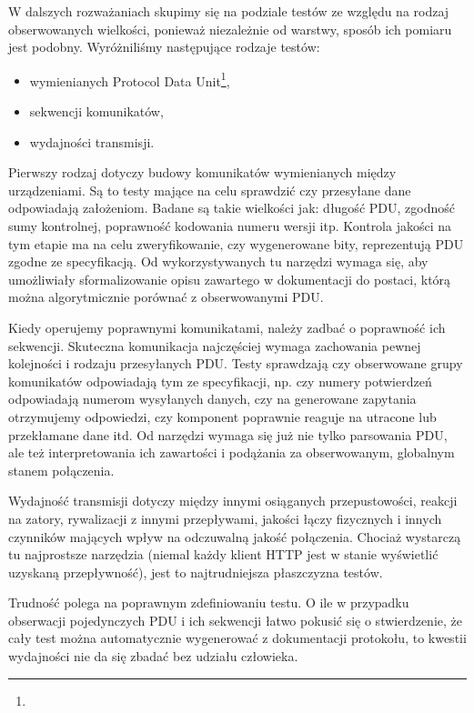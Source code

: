 \documentclass[00-praca-magisterska.tex]{subfiles}
\begin{document}
W dalszych rozważaniach skupimy się na podziale testów ze względu na rodzaj
obserwowanych wielkości, ponieważ niezależnie od warstwy, sposób ich pomiaru
jest podobny. Wyróżniliśmy następujące rodzaje testów:
\begin{itemize}
  \item{wymienianych Protocol Data Unit\footnote{},}
  \item{sekwencji komunikatów,}
  \item{wydajności transmisji.}
\end{itemize}

Pierwszy rodzaj dotyczy budowy komunikatów wymienianych między urządzeniami. Są
to testy mające na celu sprawdzić czy przesyłane dane odpowiadają założeniom.
Badane są takie wielkości jak: długość PDU, zgodność sumy kontrolnej,
poprawność kodowania numeru wersji itp. Kontrola jakości na tym etapie ma na
celu zweryfikowanie, czy wygenerowane bity, reprezentują PDU zgodne ze
specyfikacją. Od wykorzystywanych tu narzędzi wymaga się, aby umożliwiały
sformalizowanie opisu zawartego w dokumentacji do postaci, którą można
algorytmicznie porównać z obserwowanymi PDU.

Kiedy operujemy poprawnymi komunikatami, należy zadbać o poprawność ich
sekwencji. Skuteczna komunikacja najczęściej wymaga zachowania pewnej
kolejności i rodzaju przesyłanych PDU. Testy sprawdzają czy obserwowane grupy
komunikatów odpowiadają tym ze specyfikacji, np. czy numery potwierdzeń
odpowiadają numerom wysyłanych danych, czy na generowane zapytania otrzymujemy
odpowiedzi, czy komponent poprawnie reaguje na utracone lub przekłamane dane
itd. Od narzędzi wymaga się już nie tylko parsowania PDU, ale też
interpretowania ich zawartości i podążania za obserwowanym, globalnym stanem
połączenia.

Wydajność transmisji dotyczy między innymi osiąganych przepustowości, reakcji
na zatory, rywalizacji z innymi przepływami, jakości łączy fizycznych i innych
czynników mających wpływ na odczuwalną jakość połączenia. Chociaż wystarczą tu
najprostsze narzędzia (niemal każdy klient HTTP jest w stanie wyświetlić
uzyskaną przepływność), jest to najtrudniejsza płaszczyzna testów.

Trudność polega na poprawnym zdefiniowaniu testu. O ile w przypadku obserwacji
pojedynczych PDU i ich sekwencji łatwo pokusić się o stwierdzenie, że cały test
można automatycznie wygenerować z dokumentacji protokołu, to kwestii wydajności
nie da się zbadać bez udziału człowieka.
\end{document}
